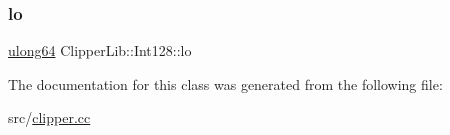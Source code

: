 \mbox{\label{class_clipper_lib_1_1_int128_a991b9da6e53c777a94fca640e505b258}} 
\subsubsection{\texorpdfstring{lo}{lo}}
{\footnotesize\ttfamily \mbox{\hyperlink{namespace_clipper_lib_a031fec5e97eb7e08708f1cafa53a232d}{ulong64}} Clipper\+Lib\+::\+Int128\+::lo}



The documentation for this class was generated from the following file\+:\begin{DoxyCompactItemize}
\item 
src/\mbox{\hyperlink{clipper_8cc}{clipper.\+cc}}\end{DoxyCompactItemize}
